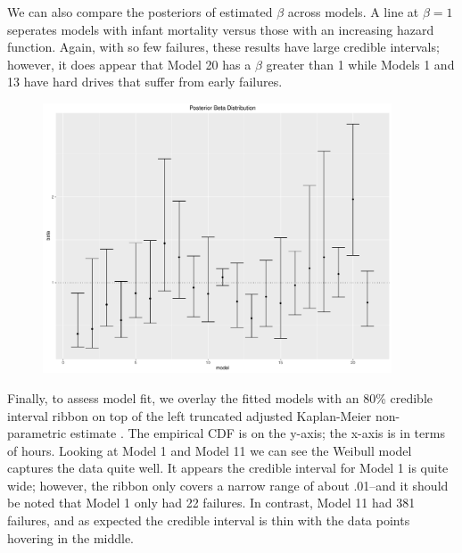 \documentclass{scrartcl}
\begin{document}
\noindent We can also compare the posteriors of estimated $\beta$ across models.  A line at $\beta=1$ seperates models with infant mortality versus those with an increasing hazard function.  Again, with so few failures, these results have large credible intervals; however, it does appear that Model 20 has a $\beta$ greater than 1 while Models 1 and 13 have hard drives that suffer from early failures.
\begin{figure}[H]
\centering
\includegraphics[height=8cm]{postbeta.pdf}
\end{figure}

\noindent Finally, to assess model fit, we overlay the fitted models with an 80\% credible interval ribbon on top of the left truncated adjusted Kaplan-Meier non-parametric estimate \cite{meeker2014statistical}.  The empirical CDF is on the y-axis; the x-axis is in terms of hours.  Looking at Model 1 and Model 11 we can see the Weibull model captures the data quite well.  It appears the credible interval for Model 1 is quite wide; however, the ribbon only covers a narrow range of about .01--and it should be noted that Model 1 only had 22 failures.  In contrast, Model 11 had 381 failures, and as expected the credible interval is thin with the data points hovering in the middle.
\end{document}
